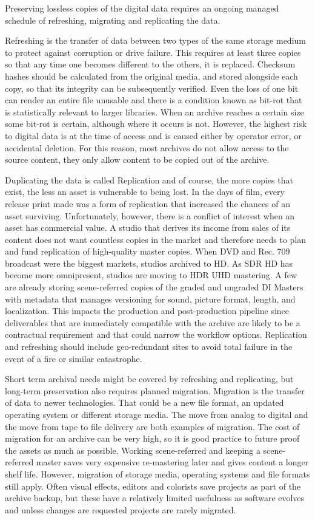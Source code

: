 Preserving lossless copies of the digital data requires an ongoing managed schedule of refreshing, migrating and replicating the data.

Refreshing is the transfer of data between two types of the same storage medium to protect against corruption or drive failure. This requires at least three copies so that any time one becomes different to the others, it is replaced. Checksum hashes should be calculated from the original media, and stored alongside each copy, so that its integrity can be subsequently verified. Even the loss of one bit can render an entire file unusable and there is a condition known as bit-rot that is statistically relevant to larger libraries. When an archive reaches a certain size some bit-rot is certain, although where it occurs is not. However, the highest risk to digital data is at the time of access and is caused either by operator error, or accidental deletion. For this reason, most archives do not allow access to the source content, they only allow content to be copied out of the archive.

Duplicating the data is called Replication and of course, the more copies that exist, the less an asset is vulnerable to being lost. In the days of film, every release print made was a form of replication that increased the chances of an asset surviving. Unfortunately, however, there is a conflict of interest when an asset has commercial value. A studio that derives its income from sales of its content does not want countless copies in the market and therefore needs to plan and fund replication of high-quality master copies. When DVD and Rec. 709 broadcast were the biggest markets, studios archived to HD. As SDR HD has become more omnipresent, studios are moving to HDR UHD mastering. A few are already storing scene-referred copies of the graded and ungraded DI Masters with metadata that manages versioning for sound, picture format, length, and localization. This impacts the production and post-production pipeline since deliverables that are immediately compatible with the archive are likely to be a contractual requirement and that could narrow the workflow options. Replication and refreshing should include geo-redundant sites to avoid total failure in the event of a fire or similar catastrophe.

Short term archival needs might be covered by refreshing and replicating, but long-term preservation also requires planned migration. Migration is the transfer of data to newer technologies. That could be a new file format, an updated operating system or different storage media.  The move from analog to digital and the move from tape to file delivery are both examples of migration. The cost of migration for an archive can be very high, so it is good practice to future proof the assets as much as possible. Working scene-referred and keeping a scene-referred master saves very expensive re-mastering later and gives content a longer shelf life. However, migration of storage media, operating systems and file formats still apply. Often visual effects, editors and colorists save projects as part of the archive backup, but these have a relatively limited usefulness as software evolves and unless changes are requested projects are rarely migrated.

